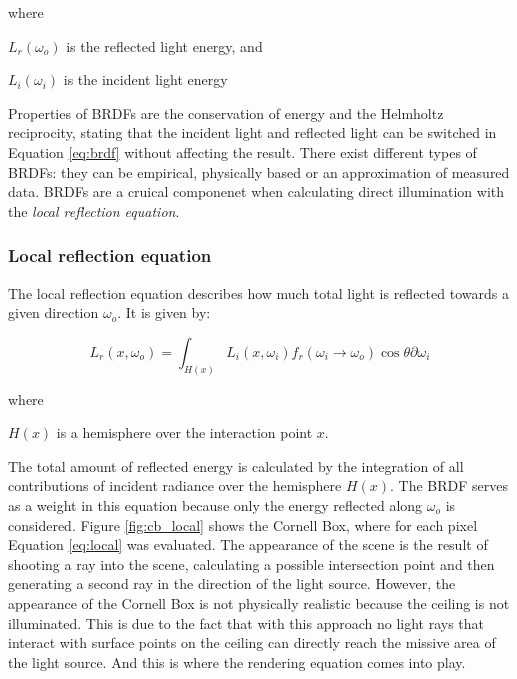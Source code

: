 \noindent where
\begin{description}
	\setlength\itemsep{0.05em}
	\item  $L_{r}(\omega_{o})$ is the reflected light energy, and
	\item  $L_{i}(\omega_{i})$ is the incident light energy
\end{description}

Properties of BRDFs are the conservation of energy and the Helmholtz reciprocity, stating that the incident light and reflected light can be switched in Equation \ref{eq:brdf} without affecting the result. There exist different types of BRDFs: they can be empirical, physically based or an approximation of measured data.
BRDFs are a cruical componenet when calculating direct illumination with the \emph{local reflection equation}.

\subsubsection{Local reflection equation}

The local reflection equation describes how much total light is reflected towards a given direction $\omega_{o}$. It is given by:

\begin{equation}\label{eq:local}
L_{r}(x, \omega_{o}) = \int_{H(x)} L_{i}(x, \omega_{i})f_{r}(\omega_{i} \rightarrow \omega_{o})\cos\theta\partial\omega_{i}
\end{equation}

\noindent where
\begin{description}
	\setlength\itemsep{0.05em}
	\item  $H(x)$ is a hemisphere over the interaction point $x$.
\end{description}

The total amount of reflected energy is calculated by the integration of all contributions of incident radiance over the hemisphere $H(x)$. The BRDF serves as a weight in this equation because only the energy reflected along $\omega_{o}$ is considered.
Figure \ref{fig:cb_local} shows the Cornell Box, where for each pixel Equation \ref{eq:local} was evaluated. The appearance of the scene is the result of shooting a ray into the scene, calculating a possible intersection point and then generating a second ray in the direction of the light source. However, the appearance of the Cornell Box is not physically realistic because the ceiling is not illuminated. This is due to the fact that with this approach no light rays that interact with surface points on the ceiling can directly reach the missive area of the light source. And this is where the rendering equation comes into play. 
 
